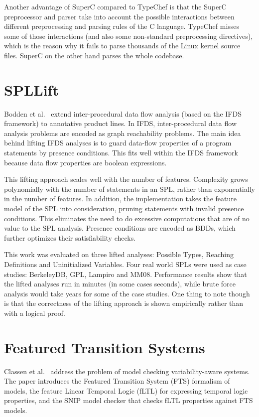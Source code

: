 \documentclass[11pt]{article}
\begin{document}
Another advantage of SuperC compared to TypeChef is that the SuperC preprocessor and parser take into account the possible interactions between different preprocessing and parsing rules of the C language. TypeChef misses some of those interactions (and also some non-standard preprocessing directives), which is the reason why it fails to parse thousands of the Linux kernel source files. SuperC on the other hand parses the whole codebase.

\section{SPLLift}

Bodden et al.~\cite{Bodden:2013} extend inter-procedural data flow analysis (based on the IFDS~\cite{Reps:1995} framework) to annotative product lines. In IFDS, inter-procedural data flow analysis problems are encoded as graph reachability problems. The main idea behind lifting IFDS analyses is to guard data-flow properties of a program statements by presence conditions. This fits well within the IFDS framework because data flow properties are boolean expressions.

This lifting approach scales well with the number of features. Complexity grows polynomially with the number of statements in an SPL, rather than exponentially in the number of features. In addition, the implementation takes the feature model of the SPL into consideration, pruning statements with invalid presence conditions. This eliminates the need to do excessive computations that are of no value to the SPL analysis. Presence conditions are encoded as BDDs, which further optimizes their satisfiability checks.

This work was evaluated on three lifted analyses: Possible Types, Reaching Definitions and Uninitialized Variables. Four real world SPLs were used as case studies: BerkeleyDB, GPL, Lampiro and MM08. Performance results show that the lifted analyses run in minutes (in some cases seconds), while brute force analysis would take years for some of the case studies. One thing to note though is that the correctness of the lifting approach is shown empirically rather than with a logical proof.

\section{Featured Transition Systems}

Classen et al.~\cite{Classen:2013} address the problem of model checking variability-aware systems. The paper introduces the Featured Transition System (FTS) formalism of models, the feature Linear Temporal Logic (fLTL) for expressing temporal logic properties, and the SNIP model checker that checks fLTL properties against FTS models.
\end{document}
